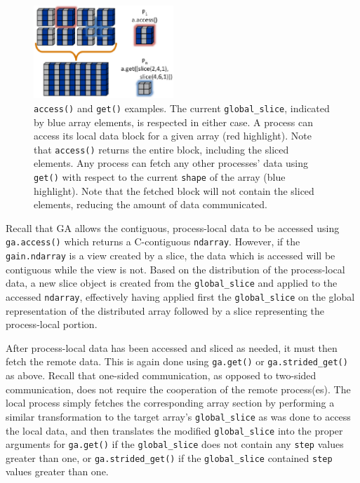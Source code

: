 \documentclass{sigplanconf}
\begin{document}
\begin{figure}[htb]
\centering
\includegraphics[width=0.47\textwidth]{image5_crop.eps}
\caption{
\texttt{access()} and \texttt{get()} examples. The current
\texttt{global\_slice}, indicated by blue array elements, is respected in
either case. A process can access its local data block for a given array (red
highlight). Note that \texttt{access()} returns the entire block, including
the sliced elements.  Any process can fetch any other processes' data using
\texttt{get()} with respect to the current \texttt{shape} of the array (blue
highlight).  Note that the fetched block will not contain the sliced elements,
reducing the amount of data communicated.
}
\label{fig:accessget}
\end{figure}

Recall that GA allows the contiguous, process-local data to be accessed using
\verb=ga.access()= which returns a C-contiguous \verb=ndarray=. However, if
the \verb=gain.ndarray= is a view created by a slice, the data which is
accessed will be contiguous while the view is not. Based on the distribution
of the process-local data, a new slice object is created from the
\verb=global_slice= and applied to the accessed \verb=ndarray=, effectively
having applied first the \verb=global_slice= on the global representation of
the distributed array followed by a slice representing the process-local
portion.

After process-local data has been accessed and sliced as needed, it must then
fetch the remote data. This is again done using \verb=ga.get()= or
\verb=ga.strided_get()= as above.  Recall that one-sided communication, as
opposed to two-sided communication, does not require the cooperation of the
remote process(es). The local process simply fetches the corresponding array
section by performing a similar transformation to the target array's
\verb=global_slice= as was done to access the local data, and then translates
the modified \verb=global_slice= into the proper arguments for \verb=ga.get()=
if the \verb=global_slice= does not contain any \verb=step= values greater
than one, or \verb=ga.strided_get()= if the \verb=global_slice= contained
\verb=step= values greater than one.
\end{document}
